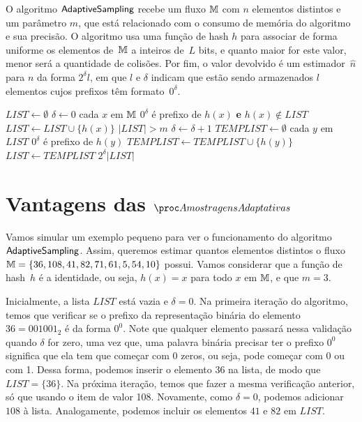 O algoritmo $\textsf{AdaptiveSampling}$ recebe um fluxo $\mathbb{M}$ com $n$ elementos distintos e um parâmetro $m$, que está relacionado com o 
consumo de memória do algoritmo e sua precisão. O algoritmo usa uma função de hash $h$ para associar de forma uniforme 
os elementos de~$\mathbb{M}$ a inteiros de~$L$ bits, e quanto maior for este valor, menor será a quantidade de colisões. Por 
fim, o valor devolvido é um estimador~$\hat{n}$ para $n$ da forma $2^{\delta} l$, em que $l$ e $\delta$ indicam que 
estão sendo armazenados $l$ elementos cujos prefixos têm formato~$0^{\delta}$. 

\begin{codebox}
  \li $LIST \gets \emptyset$
  \li $\delta \gets 0$
  \li \For cada $x$ em $\mathbb{M}$ 
  \li    \Do 
         \If $0^{\delta}$ é prefixo de $h(x)$ \textbf{e} $h(x) \not\in LIST$
  \li             \Then $LIST \gets LIST \cup \{ h(x) \}$
         \End
  \li    \While $|LIST| > m$                                   \label{li:as:while}
  \li    \Do
         $\delta \gets \delta + 1$
  \li    $TEMPLIST \gets \emptyset$
  \li    \For cada $y$ em $LIST$
  \li    \Do
            \If $0^{\delta}$ é prefixo de $h(y)$
  \li       \Then $TEMPLIST \gets TEMPLIST \cup \{ h(y) \}$
            \End
         \End
  \li    $LIST \gets TEMPLIST$
         \End 
      \End
  \li
  \Return $2^{\delta} |LIST|$   
  \End
\end{codebox}


\section{Vantagens das $\asampling$}
\label{lab:chapter:04:02}

Vamos simular um exemplo pequeno para ver o funcionamento do algoritmo $\textsf{AdaptiveSampling}$. Assim, queremos estimar quantos elementos 
distintos o fluxo $\mathbb{M} = \{ 36, 108, 41, 82, 71, 61, 5, 54, 10 \}$ possui. Vamos considerar que a função de hash~$h$ é
a identidade, ou seja, $h(x) = x$ para todo $x$ em $\mathbb{M}$, e que $m = 3$. 

Inicialmente, a lista $LIST$ está vazia e $\delta = 0$. Na primeira iteração do algoritmo, temos que verificar se o 
prefixo da representação binária do elemento $36 = 001001_2$ é da forma $0^0$. Note que qualquer elemento passará nessa 
validação quando $\delta$ for zero, uma vez que, uma palavra binária precisar ter o prefixo $0^0$ significa que ela tem 
que começar com 0 zeros, ou seja, pode começar com 0 ou com 1. Dessa forma, podemos inserir o elemento $36$ na lista, de 
modo que $LIST = \{ 36 \}$. Na próxima iteração, temos que fazer a mesma verificação anterior, só que usando o item de 
valor 108. Novamente, como $\delta = 0$, podemos adicionar $108$ à lista. Analogamente, podemos incluir os elementos 
$41$ e $82$ em $LIST$. 

